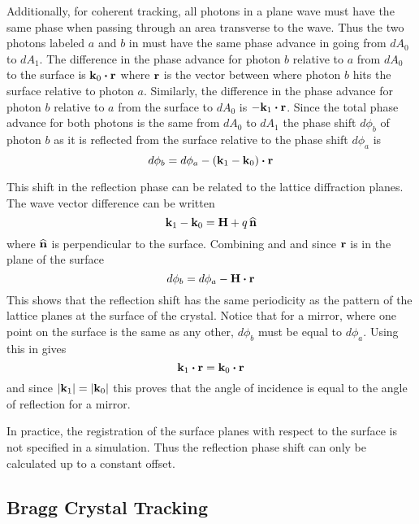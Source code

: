 Additionally, for coherent tracking, all photons in a plane wave must
have the same phase when passing through an area transverse to the
wave. Thus the two photons labeled $a$ and $b$ in
 must have the same phase advance in going from
$dA_0$ to $dA_1$. The difference in the phase advance for photon $b$
relative to $a$ from $dA_0$ to the surface is ${\bf k}_0 \mathbin{\boldsymbol{\cdot}} {\bf r}$
where ${\bf r}$ is the vector between where photon $b$ hits the surface
relative to photon $a$. Similarly, the difference in the phase advance
for photon $b$ relative to $a$ from the surface to $dA_0$ is $-{\bf k}_1
\mathbin{\boldsymbol{\cdot}} {\bf r}$. Since the total phase advance for both photons is the
same from $dA_0$ to $dA_1$ the phase shift $d\phi_b$ of photon $b$ as
it is reflected from the surface relative to the phase shift $d\phi_a$
is
\begin{equation}
  d\phi_b = d\phi_a - ({\bf k}_1 - {\bf k}_0) \mathbin{\boldsymbol{\cdot}} {\bf r}
  \label{dpbdpa}
\end{equation}

This shift in the reflection phase can be related to the lattice
diffraction planes. The wave vector difference can be written
\begin{equation}
  {\bf k}_1 - {\bf k}_0 = {\bf H} + q \, {\widehat{\bf n}}
  \label{k1k0}
\end{equation}
where ${\widehat{\bf n}}$ is perpendicular to the surface. Combining
 and  and since ${\bf r}$ is in
the plane of the surface
\begin{equation}
  d\phi_b = d\phi_a - {\bf H} \mathbin{\boldsymbol{\cdot}} {\bf r}
\end{equation}
This shows that the reflection shift has the same periodicity as the
pattern of the lattice planes at the surface of the crystal. Notice
that for a mirror, where one point on the surface is the same as any
other, $d\phi_b$ must be equal to $d\phi_a$. Using this in 
gives 
\begin{equation}
  {\bf k}_1 \mathbin{\boldsymbol{\cdot}} {\bf r} = {\bf k}_0 \mathbin{\boldsymbol{\cdot}} {\bf r}
\end{equation}
and since $|{\bf k}_1| = |{\bf k}_0|$ this proves that the angle of
incidence is equal to the angle of reflection for a mirror.

In practice, the registration of the surface planes with respect to
the surface is not specified in a simulation. Thus the reflection
phase shift can only be calculated up to a constant offset. 

\subsection{Bragg Crystal Tracking}
\label{s:bragg.track}

